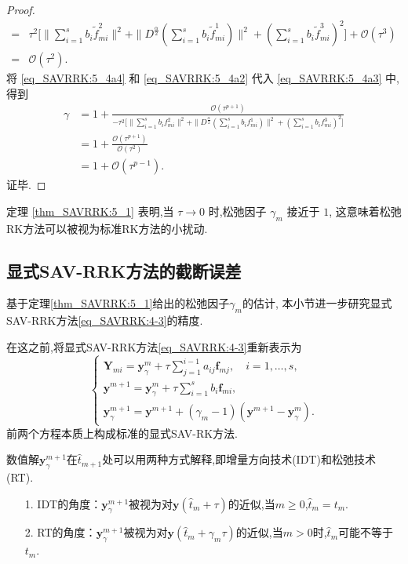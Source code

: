 \begin{proof}
\begin{align}
	=&\tau^2\Big[\|\sum\limits_{i=1}^{s}b_i\tilde{f}_{mi}^2\|^2+ \|D^\frac{\alpha}{2}(\sum\limits_{i=1}^{s}b_i\tilde{f}_{mi}^1)\|^2+(\sum\limits_{i=1}^{s}b_i\tilde{f}_{mi}^3)^2\Big]+\mathcal{O}(\tau^3)\nonumber\\
	=&\mathcal{O}(\tau^2).
\end{align}
将 \eqref{eq_SAVRRK:5_4a4} 和 \eqref{eq_SAVRRK:5_4a2} 代入 \eqref{eq_SAVRRK:5_4a3} 中,得到
\begin{align}\label{eq_SAVRRK:5_4a5}
	\gamma&=1+\frac{\mathcal{O}(\tau^{p+1})}{-\tau^2\Big[\|\sum\limits_{i=1}^{s}b_if_{mi}^2\|^2+ \|D^\frac{\alpha}{2}(\sum\limits_{i=1}^{s}b_if_{mi}^1)\|^2+(\sum\limits_{i=1}^{s}b_if_{mi}^3)^2\Big]}\nonumber\\
	&=1+\frac{\mathcal{O}(\tau^{p+1})}{\mathcal{O}(\tau^2)}\nonumber\\
	&=1+\mathcal{O}(\tau^{p-1}).
\end{align}
证毕.
\end{proof}

\begin{remark}\label{rk_SAVRRK:5_1}
定理 \ref{thm_SAVRRK:5_1} 表明,当 $\tau\rightarrow 0$ 时,松弛因子 $\gamma_m$ 接近于 $1$,
这意味着松弛RK方法可以被视为标准RK方法的小扰动.
\end{remark}

\subsection{显式SAV-RRK方法的截断误差}
基于定理\ref{thm_SAVRRK:5_1}给出的松弛因子$\gamma_m$的估计, 本小节进一步研究显式SAV-RRK方法\eqref{eq_SAVRRK:4-3}的精度.

在这之前,将显式SAV-RRK方法\eqref{eq_SAVRRK:4-3}重新表示为
\begin{equation}
\left\{\begin{array}{l}
\bm{Y}_{m i}=\bm{y}_\gamma^m+\tau \sum\limits_{j=1}^{i-1} a_{i j} \bm{f}_{m j}, \quad i=1, \ldots, s, \\
\bm{y}^{m+1}=\bm{y}_\gamma^m+\tau \sum\limits_{i=1}^s b_i \bm{f}_{m i},\\
\bm{y}_\gamma^{m+1}=\bm{y}^{m+1}+\left(\gamma_m-1\right)\left(\bm{y}^{m+1}-\bm{y}_\gamma^m\right) .
\end{array}\right.\label{eq_SAVRRK:4-321}
\end{equation}
前两个方程本质上构成标准的显式SAV-RK方法.

数值解$\bm{y}_\gamma^{m+1}$在$\hat{t}_{m+1}$处可以用两种方式解释\cite{ketchesonRelaxationRungeKutta2019},即增量方向技术(IDT)和松弛技术(RT).
\begin{itemize}
\item[1.] IDT的角度：$\bm{y}_\gamma^{m+1}$被视为对$\bm{y}\left(\hat{t}_m+\tau\right)$的近似,当$m \geq 0$,$\hat{t}_m=t_m$.
\item[2.] RT的角度：$\bm{y}_\gamma^{m+1}$被视为对$\bm{y}\left(\hat{t}_m+\gamma_m \tau\right)$的近似,当$m>0$时,$\hat{t}_m$可能不等于$t_m$.
\end{itemize}

